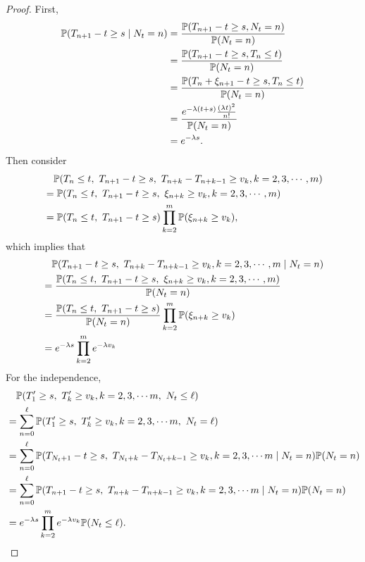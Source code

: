 \begin{proof}
    \noindent First, 
    \begin{equation*}
        \begin{aligned}
            \mathbb{P}(T_{n+1} - t \geq s \mid N_t = n) &= \frac{\mathbb{P}(T_{n+1} - t \geq s, N_t = n)}{\mathbb{P}(N_t = n)} \\
            &= \frac{\mathbb{P}(T_{n+1} - t \geq s, T_n\leq t)}{\mathbb{P}(N_t = n)} \\
            &= \frac{\mathbb{P}(T_{n} + \xi_{n+1} - t \geq s, T_n\leq t)}{\mathbb{P}(N_t = n)} \\
            &= \frac{e^{-\lambda(t+s)}\frac{(\lambda t)^2}{n!}}{\mathbb{P}(N_t = n)} \\
            &= e^{-\lambda s}.
        \end{aligned}
    \end{equation*}
    Then consider
    \begin{equation*}
        \begin{aligned}
            &\quad\mathbb{P}(T_n \leq t,~T_{n+1} - t \geq s,~T_{n+k} - T_{n+k-1} \geq v_k,k=2,3,\cdots,m)\\
            &=\mathbb{P}(T_n \leq t,~T_{n+1} - t \geq s,~\xi_{n+k} \geq v_k,k=2,3,\cdots,m) \\
            &=\mathbb{P}(T_n \leq t,~T_{n+1} - t \geq s)\prod_{k=2}^{m}\mathbb{P}(\xi_{n+k} \geq v_k),
        \end{aligned}
    \end{equation*}
    which implies that
    \begin{align*}
        &\quad\mathbb{P}(T_{n+1} - t \geq s,~T_{n+k} - T_{n+k-1} \geq v_k,k=2,3,\cdots,m \mid N_t = n)\\
        &= \frac{\mathbb{P}(T_n \leq t,~T_{n+1} - t \geq s,~\xi_{n+k} \geq v_k,k=2,3,\cdots,m)}{\mathbb{P}(N_t = n)} \\
        &= \frac{\mathbb{P}(T_n \leq t,~T_{n+1} - t \geq s)}{\mathbb{P}(N_t = n)}\prod_{k=2}^{m}\mathbb{P}(\xi_{n+k} \geq v_k) \\
        &= e^{-\lambda s} \prod_{k=2}^{m} e^{-\lambda v_k}
    \end{align*}
    For the independence,
    \begin{align*}
        &\quad\mathbb{P}(T_1^\prime \geq s,~T_k^\prime \geq v_k,k=2,3,\cdots m,~N_t \leq \ell) \\
        &= \sum_{n=0}^\ell \mathbb{P}(T_1^\prime \geq s,~T_k^\prime \geq v_k,k=2,3,\cdots m,~N_t = \ell) \\
        &= \sum_{n=0}^\ell \mathbb{P}(T_{N_t + 1} - t \geq s,~T_{N_t + k} - T_{N_t+k-1} \geq v_k,k=2,3,\cdots m \mid N_t = n) \mathbb{P}(N_t = n)\\
        &= \sum_{n=0}^\ell \mathbb{P}(T_{n + 1} - t \geq s,~T_{n + k} - T_{n+k-1} \geq v_k,k=2,3,\cdots m \mid N_t = n) \mathbb{P}(N_t = n) \\
        &= e^{-\lambda s} \prod_{k=2}^{m} e^{-\lambda v_k} \mathbb{P}(N_t \leq \ell).
    \end{align*}


\end{proof}
